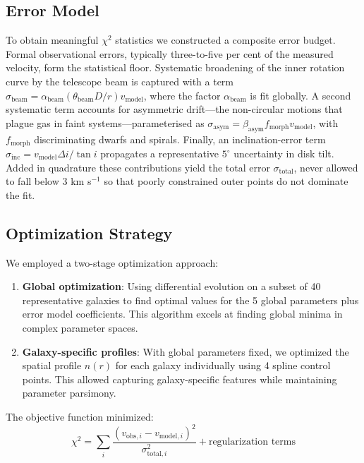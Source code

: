 \documentclass[10pt,a4paper]{article}
\newcommand{\chisq}{\chi^2}
\begin{document}
\subsection{Error Model}

To obtain meaningful $\chisq$ statistics we constructed a composite error budget. Formal observational errors, typically three-to-five per cent of the measured velocity, form the statistical floor. Systematic broadening of the inner rotation curve by the telescope beam is captured with a term $\sigma_{\mathrm{beam}} = \alpha_{\mathrm{beam}} (\theta_{\mathrm{beam}} D/r) v_{\mathrm{model}}$, where the factor $\alpha_{\mathrm{beam}}$ is fit globally. A second systematic term accounts for asymmetric drift---the non-circular motions that plague gas in faint systems---parameterised as $\sigma_{\mathrm{asym}} = \beta_{\mathrm{asym}} f_{\mathrm{morph}} v_{\mathrm{model}}$, with $f_{\mathrm{morph}}$ discriminating dwarfs and spirals. Finally, an inclination-error term $\sigma_{\mathrm{inc}} = v_{\mathrm{model}} \Delta i/\tan i$ propagates a representative $5^{\circ}$ uncertainty in disk tilt. Added in quadrature these contributions yield the total error $\sigma_{\mathrm{total}}$, never allowed to fall below 3 km s$^{-1}$ so that poorly constrained outer points do not dominate the fit.

\subsection{Optimization Strategy}

We employed a two-stage optimization approach:

\begin{enumerate}
\item \textbf{Global optimization}: Using differential evolution on a subset of 40 representative galaxies to find optimal values for the 5 global parameters plus error model coefficients. This algorithm excels at finding global minima in complex parameter spaces.

\item \textbf{Galaxy-specific profiles}: With global parameters fixed, we optimized the spatial profile $n(r)$ for each galaxy individually using 4 spline control points. This allowed capturing galaxy-specific features while maintaining parameter parsimony.
\end{enumerate}

The objective function minimized:
\begin{equation}
\chisq = \sum_i \frac{(v_{\text{obs},i} - v_{\text{model},i})^2}{\sigma_{\text{total},i}^2} + \text{regularization terms}
\end{equation}
\end{document}
